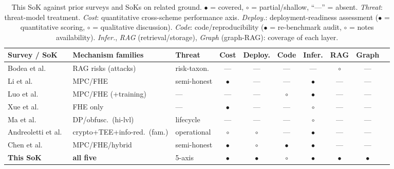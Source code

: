 \begin{table}[t!]
  \centering \footnotesize\setlength{\tabcolsep}{4pt}
  \caption{This SoK against prior surveys and SoKs on related ground.
    $\bullet$ = covered, $\circ$ = partial/shallow, ``---'' = absent. \emph{Threat}: threat-model
    treatment. \emph{Cost}: quantitative cross-scheme performance axis. \emph{Deploy.}:
    deployment-readiness assessment ($\bullet$ = quantitative scoring, $\circ$ = qualitative discussion).
    \emph{Code}: code/reproducibility ($\bullet$ = re-benchmark audit, $\circ$ = notes availability).
    \emph{Infer.}, \emph{RAG} (retrieval/storage), \emph{Graph} (graph-RAG): coverage of each layer.}
  \label{tab:prior-soks}
  \begin{tabular*}{\textwidth}{@{\extracolsep{\fill}}lllccccccc@{}}
    \toprule
    Survey / SoK & Mechanism families & Threat & Cost & Deploy. & Code & Infer. & RAG & Graph \\
    \midrule
    Bodea et al.~\citep{bodea_sok}        & RAG risks (attacks)        & risk-taxon. & ---       & ---       & ---       & ---       & $\circ$   & --- \\
    Li et al.~\citep{li_pti_survey}       & MPC/FHE                    & semi-honest & $\bullet$ & ---       & ---       & $\bullet$ & ---       & --- \\
    Luo et al.~\citep{luo_cplm_survey}    & MPC/FHE (+training)        & ---         & ---       & ---       & $\circ$   & $\bullet$ & ---       & --- \\
    Xue et al.~\citep{xue_fhe_sok}        & FHE only                   & ---         & $\bullet$ & ---       & ---       & $\circ$   & ---       & --- \\
    Ma et al.~\citep{ma_semantic_sok}     & DP/obfusc.\ (hi-lvl)       & lifecycle   & ---       & ---       & ---       & $\circ$   & ---       & --- \\
    Andreoletti et al.~\citep{andreoletti_ppi_practice} & crypto+TEE+info-red.\ (fam.) & operational & $\circ$ & $\circ$ & --- & $\bullet$ & --- & --- \\
    Chen et al.~\citep{chen_sok_pti}      & MPC/FHE/hybrid             & semi-honest & $\bullet$ & $\circ$   & $\bullet$ & $\bullet$ & ---       & --- \\
    \textbf{This SoK}                     & \textbf{all five}          & 5-axis      & $\bullet$ & $\bullet$ & $\circ$   & $\bullet$ & $\bullet$ & $\bullet$ \\
    \bottomrule
  \end{tabular*}
\end{table}

